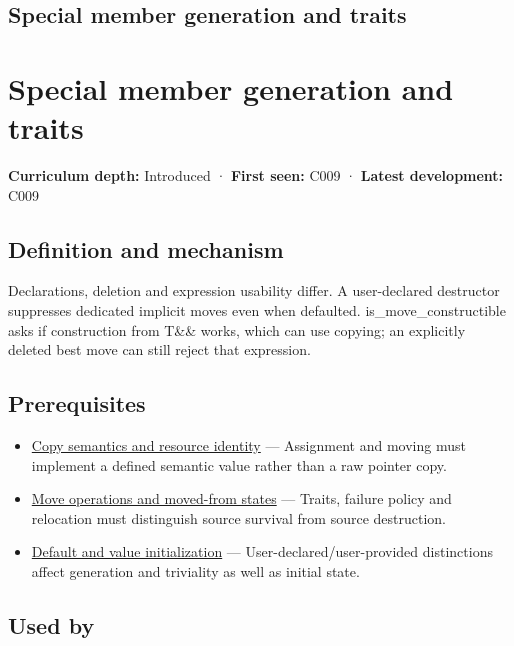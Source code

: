 \hypertarget{appendix-42e02a12c694}{}
\section*{Special member generation and traits}
\chapter{Special member generation and traits}\label{appendix-42e02a12c694-special-member-generation-and-traits}

\textbf{Curriculum depth:} Introduced · \textbf{First seen:} C009 · \textbf{Latest development:} C009

\section{Definition and mechanism}\label{appendix-42e02a12c694-definition-and-mechanism}

Declarations, deletion and expression usability differ. A user-declared destructor suppresses dedicated implicit moves even when defaulted. is\_move\_constructible asks if construction from T\&\& works, which can use copying; an explicitly deleted best move can still reject that expression.

\section{Prerequisites}\label{appendix-42e02a12c694-prerequisites}

\begin{itemize}
\tightlist
\item
  \hyperref[appendix-1340cd1ce582]{Copy semantics and resource identity} --- Assignment and moving must implement a defined semantic value rather than a raw pointer copy.
\item
  \hyperref[appendix-5636651017c2]{Move operations and moved-from states} --- Traits, failure policy and relocation must distinguish source survival from source destruction.
\item
  \hyperref[appendix-ba8c1a9fe03f]{Default and value initialization} --- User-declared/user-provided distinctions affect generation and triviality as well as initial state.
\end{itemize}

\section{Used by}\label{appendix-42e02a12c694-used-by}

